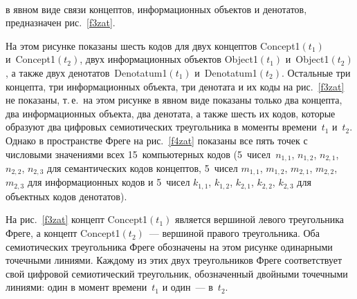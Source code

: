 \begin{figure} %
\begin{center}
\vspace*{1pt}
\mbox{%
\epsfxsize=159.984mm
}
\end{center}
\vspace*{-6pt}
\vspace*{6pt}
\end{figure}

\begin{multicols}{2}

\noindent
 в явном виде связи
 концептов, 
информационных объектов и денотатов, предназначен рис.~\ref{f3zat}.
  
   На этом рисунке показаны шесть кодов для двух концептов 
Concept1$(t_1)$ и~Concept1$(t_2)$, двух информационных объектов Object1$(t_1)$ 
и~Object1$(t_2)$, а также двух денотатов~Denotatum1$(t_1)$ и~Denotatum1$(t_2)$. 
Остальные три концепта, три информационных объекта, три денотата и их коды на 
рис.~\ref{f3zat} не показаны, т.\,е.\ на этом рисунке в явном виде показаны только два 
концепта, два информационных объекта, два денотата, а также шесть их кодов, которые 
образуют два цифровых семиотических треугольника в моменты времени~$t_1$ и~$t_2$. 
Однако в пространстве Фреге на рис.~\ref{f4zat} показаны все пять точек с числовыми 
значениями всех 15~компьютерных кодов (5~чисел~$n_{1,1}$, $n_{1,2}$, $n_{2,1}$, $n_{2,2}$, 
$n_{2,3}$ для семантических кодов концептов, 5~чисел $m_{1,1}$, $m_{1,2}$, $m_{2,1}$, $m_{2,2}$, 
$m_{2,3}$ для информационных кодов и 5~чисел $k_{1,1}$, $k_{1,2}$, $k_{2,1}$, $k_{2,2}$, $k_{2,3}$ 
для объектных кодов денотатов).
\columnbreak
   
   
   На рис.~\ref{f3zat} концепт Concept1$(t_1)$ является вершиной левого треугольника 
Фреге, а концепт Concept1$(t_2)$~--- вершиной правого треугольника. Оба семиотических 
треугольника Фреге обозначены на этом рисунке одинарными точечными линиями. Каждому 
из этих двух треугольников Фреге соответствует свой цифровой семиотический треугольник, 
обозначенный двойными точечными линиями: один в момент времени~$t_1$ и один~--- 
в~$t_2$.

   \begin{figure*} %
   \begin{center}
\vspace*{1pt}
\mbox{%
\epsfxsize=122.316mm
}
\end{center}
\vspace*{-6pt}
\end{figure*}


\end{multicols}
